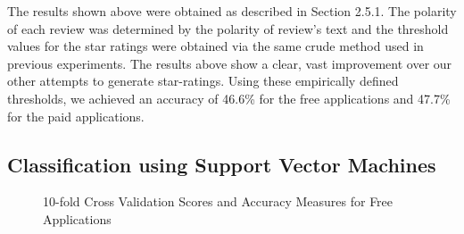 \documentclass[11pt]{report} %
\begin{document}
The results shown above were obtained as described in Section 2.5.1. The polarity of each review was determined by the polarity of review's text and the threshold values for the star ratings were obtained via the same crude method used in previous experiments. The results above show a clear, vast improvement over our other attempts to generate star-ratings. Using these empirically defined thresholds, we achieved  an accuracy of 46.6\% for the free applications and 47.7\% for the paid applications.  

\newpage

		\subsection{Classification using Support Vector Machines}

\begin{figure}[h!]
\centering
{}
\caption[Optional caption for list of figures]{10-fold Cross Validation Scores and Accuracy Measures for Free Applications }
\label{fig:analysis_free}
\end{figure}
\end{document}
